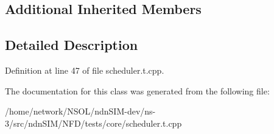 \subsection*{Additional Inherited Members}


\subsection{Detailed Description}


Definition at line 47 of file scheduler.\+t.\+cpp.



The documentation for this class was generated from the following file\+:\begin{DoxyCompactItemize}
\item 
/home/network/\+N\+S\+O\+L/ndn\+S\+I\+M-\/dev/ns-\/3/src/ndn\+S\+I\+M/\+N\+F\+D/tests/core/scheduler.\+t.\+cpp\end{DoxyCompactItemize}
